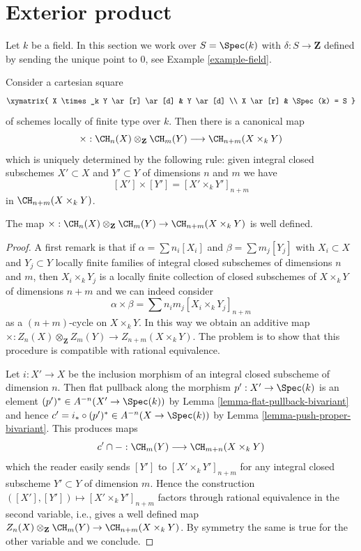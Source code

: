 








\section{Exterior product}
\label{section-exterior-product}

\noindent
Let $k$ be a field. In this section we work over $S = \Spec(k)$ with
$\delta : S \to \mathbf{Z}$ defined by sending the unique point to $0$, see
Example \ref{example-field}.

\medskip\noindent
Consider a cartesian square
$$
\xymatrix{
X \times_k Y \ar[r] \ar[d] & Y \ar[d] \\
X \ar[r] & \Spec(k) = S
}
$$
of schemes locally of finite type over $k$. Then there is a canonical map
$$
\times :
\CH_n(X) \otimes_{\mathbf{Z}} \CH_m(Y)
\longrightarrow
\CH_{n + m}(X \times_k Y)
$$
which is uniquely determined by the following rule:
given integral closed subschemes $X' \subset X$
and $Y' \subset Y$ of dimensions $n$ and $m$ we have
$$
[X'] \times [Y'] = [X' \times_k Y']_{n + m}
$$
in $\CH_{n + m}(X \times_k Y)$.

\begin{lemma}
\label{lemma-exterior-product-well-defined}
The map
$\times : \CH_n(X) \otimes_{\mathbf{Z}} \CH_m(Y) \to \CH_{n + m}(X \times_k Y)$
is well defined.
\end{lemma}

\begin{proof}
A first remark is that if $\alpha = \sum n_i[X_i]$
and $\beta = \sum m_j[Y_j]$ with $X_i \subset X$ and $Y_j \subset Y$
locally finite families of integral closed subschemes of
dimensions $n$ and $m$, then
$X_i \times_k Y_j$ is a locally finite
collection of closed subschemes of $X \times_k Y$ of
dimensions $n + m$ and we can indeed consider
$$
\alpha \times \beta = \sum n_i m_j [X_i \times_k Y_j]_{n + m}
$$
as a $(n + m)$-cycle on $X \times_k Y$. In this way we obtain an
additive map
$\times : Z_n(X) \otimes_{\mathbf{Z}} Z_m(Y) \to Z_{n + m}(X \times_k Y)$.
The problem is to show that
this procedure is compatible with rational equivalence.

\medskip\noindent
Let $i : X' \to X$ be the inclusion morphism of
an integral closed subscheme of dimension $n$.
Then flat pullback along the morphism $p' : X' \to \Spec(k)$ is an element
$(p')^* \in A^{-n}(X' \to \Spec(k))$ by
Lemma \ref{lemma-flat-pullback-bivariant}
and hence $c' = i_* \circ (p')^* \in A^{-n}(X \to \Spec(k))$ by
Lemma \ref{lemma-push-proper-bivariant}.
This produces maps
$$
c' \cap - : \CH_m(Y) \longrightarrow \CH_{m + n}(X \times_k Y)
$$
which the reader easily sends $[Y']$ to $[X' \times_k Y']_{n + m}$
for any integral closed subscheme $Y' \subset Y$ of dimension
$m$. Hence the construction
$([X'], [Y']) \mapsto [X' \times_k Y']_{n + m}$
factors through rational equivalence in the second variable, i.e.,
gives a well defined map
$Z_n(X) \otimes_{\mathbf{Z}} \CH_m(Y) \to \CH_{n + m}(X \times_k Y)$.
By symmetry the same is true for the other variable and we conclude.
\end{proof}

